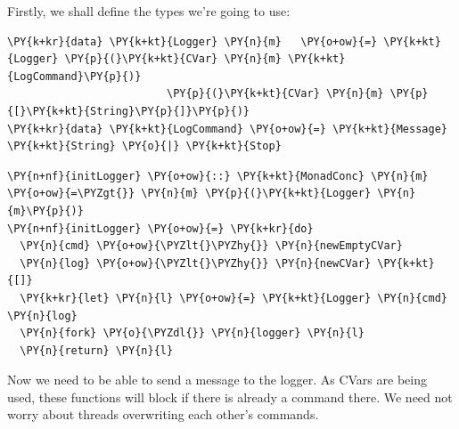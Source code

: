 Firstly, we shall define the types we're going to use:


\begin{Verbatim}[commandchars=\\\{\}]
\PY{k+kr}{data} \PY{k+kt}{Logger} \PY{n}{m}   \PY{o+ow}{=} \PY{k+kt}{Logger} \PY{p}{(}\PY{k+kt}{CVar} \PY{n}{m} \PY{k+kt}{LogCommand}\PY{p}{)}
                         \PY{p}{(}\PY{k+kt}{CVar} \PY{n}{m} \PY{p}{[}\PY{k+kt}{String}\PY{p}{]}\PY{p}{)}
\PY{k+kr}{data} \PY{k+kt}{LogCommand} \PY{o+ow}{=} \PY{k+kt}{Message} \PY{k+kt}{String} \PY{o}{|} \PY{k+kt}{Stop}
\end{Verbatim}


\begin{Verbatim}[commandchars=\\\{\}]
\PY{n+nf}{initLogger} \PY{o+ow}{::} \PY{k+kt}{MonadConc} \PY{n}{m} \PY{o+ow}{=\PYZgt{}} \PY{n}{m} \PY{p}{(}\PY{k+kt}{Logger} \PY{n}{m}\PY{p}{)}
\PY{n+nf}{initLogger} \PY{o+ow}{=} \PY{k+kr}{do}
  \PY{n}{cmd} \PY{o+ow}{\PYZlt{}\PYZhy{}} \PY{n}{newEmptyCVar}
  \PY{n}{log} \PY{o+ow}{\PYZlt{}\PYZhy{}} \PY{n}{newCVar} \PY{k+kt}{[]}
  \PY{k+kr}{let} \PY{n}{l} \PY{o+ow}{=} \PY{k+kt}{Logger} \PY{n}{cmd} \PY{n}{log}
  \PY{n}{fork} \PY{o}{\PYZdl{}} \PY{n}{logger} \PY{n}{l}
  \PY{n}{return} \PY{n}{l}
\end{Verbatim}

Now we need to be able to send a message to the logger. As CVars are
being used, these functions will block if there is already a command
there. We need not worry about threads overwriting each other's
commands.

%


